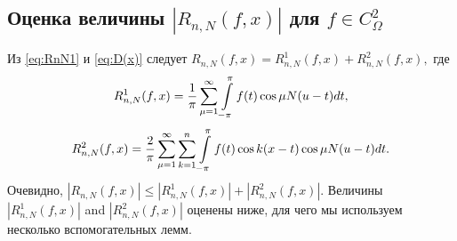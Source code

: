 %	

\subsection{Оценка величины $\left|R_{n,N}(f,x)\right|$ для $f \in C^{2}_\Omega$}

Из \eqref{eq:RnN1} и \eqref{eq:D(x)} следует
$
R_{n,N}(f,x)=R_{n,N}^{1}(f,x)+R_{n,N}^{2}(f,x),
$
где
\begin{equation*}
R_{n,N}^{1}(f,x)=\frac{1}{\pi}\sum_{\mu=1}^{\infty}\intop_{-\pi}^{\pi}f(t)\cos\mu N(u-t)dt,\label{eq:R1_formula1}
\end{equation*}
\begin{equation}
R_{n,N}^{2}(f,x)=\frac{2}{\pi}\sum_{\mu=1}^{\infty}\sum_{k=1}^{n}\intop_{-\pi}^{\pi}f(t)\cos k(x-t)\cos\mu N(u-t)dt.\label{eq:R2_formula1}
\end{equation}
Очевидно,
$
\left|R_{n,N}(f,x)\right| \leq \left|R_{n,N}^{1}(f,x)\right| + \left|R_{n,N}^{2}(f,x)\right|
$. Величины $\left|R_{n,N}^{1}(f,x)\right|$ and $\left|R_{n,N}^{2}(f,x)\right|$ оценены ниже, для чего мы используем несколько вспомогательных лемм.


